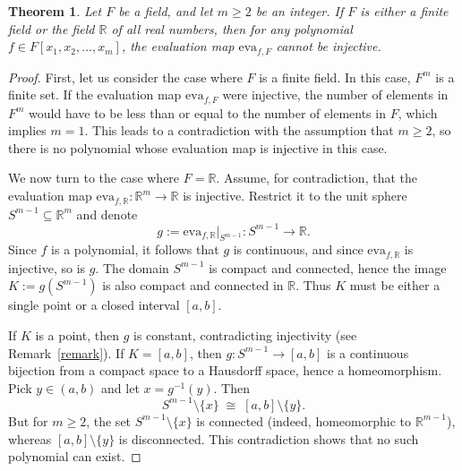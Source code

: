 \documentclass{amsart}
\newtheorem{theorem}{Theorem}[section]
\theoremstyle{definition}
\begin{document}
	\begin{theorem}\label{variable}
		Let \( F \) be a field, and let \( m \geq 2 \) be an integer. If \( F \) is either a finite field or the field $\mathbb{R}$ of all real numbers, then for any polynomial \( f \in F[x_1, x_2, \ldots, x_m] \), the evaluation map \( \mathrm{eva}_{f,F} \) cannot be injective.
	\end{theorem}
	
	\begin{proof}
		First, let us consider the case where \( F \) is a finite field. In this case, \( F^m \) is a finite set. If the evaluation map \( \mathrm{eva}_{f,F} \) were injective, the number of elements in \( F^m \) would have to be less than or equal to the number of elements in \( F \), which implies \( m = 1 \). This leads to a contradiction with  the assumption that $m\geq2$, so there is no polynomial whose evaluation map is injective in this case.
		
		We now turn to the case where \( F = \mathbb{R} \).	 Assume, for contradiction, that the evaluation map $\mathrm{eva}_{f,\mathbb{R}} : \mathbb{R}^m \to \mathbb{R}$ is injective. Restrict it to the unit sphere $S^{m-1} \subseteq \mathbb{R}^m$ and denote
		\[
		g := \mathrm{eva}_{f,\mathbb{R}}|_{S^{m-1}} : S^{m-1} \to \mathbb{R}.
		\]
		Since $f$ is a polynomial, it follows that $g$ is continuous, and since $\mathrm{eva}_{f,\mathbb{R}}$ is injective, so is $g$. The domain $S^{m-1}$ is compact and connected, hence the image 
		$K := g(S^{m-1})$ is also compact and connected in $\mathbb{R}$. Thus $K$ must be either a single point or a closed interval $[a,b]$.
		
		If $K$ is a point, then $g$ is constant, contradicting injectivity (see Remark~\ref{remark}). 
		If $K=[a,b]$, then $g : S^{m-1} \to [a,b]$ is a continuous bijection from a compact space to a Hausdorff space, hence a homeomorphism. 
		Pick $y \in (a,b)$ and let $x = g^{-1}(y)$. Then
		\[
		S^{m-1}\setminus \{x\} \;\cong\; [a,b]\setminus \{y\}.
		\]
		But for $m\geq 2$, the set $S^{m-1}\setminus\{x\}$ is connected 
		(indeed, homeomorphic to $\mathbb{R}^{m-1}$), 
		whereas $[a,b]\setminus\{y\}$ is disconnected. 
		This contradiction shows that no such polynomial can exist.
	\end{proof}
	
\end{document}
